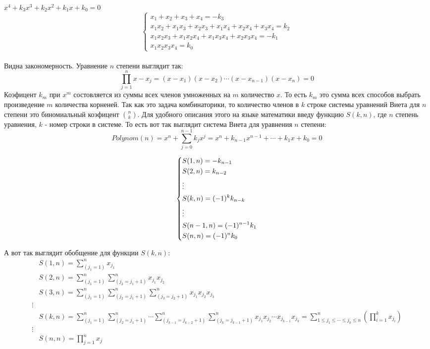 \documentclass{article} %
\begin{document}
{		$x^4+k_3x^3+k_2x^2+k_1x+k_0 = 0$\\
		$$\begin{cases} x_1+x_2+x_3+x_4 = -k_3\\ x_1x_2+x_1x_3+x_2x_3+x_1x_4+x_2x_4+x_3x_4 = k_2\\ x_1x_2x_3+x_1x_2x_4+x_1x_3x_4+x_2x_3x_4= -k_1\\  x_1x_2x_3x_4= k_0\end{cases}$$\\
		Видна закономерность. Уравнение $n$ степени выглядит так:\\
		$$\prod_{j=1}^{n}x-x_j = (x-x_1)(x-x_2)\cdots(x-x_{n-1})(x-x_n) = 0$$
		Коэфицент $k_m$ при $x^m$ состовляется из суммы всех членов умноженных на $m$ количество $x$. То есть $k_m$ это сумма всех способов выбрать произведение $m$ количества корненей. Так как это задача комбинаторики, то количество членов в $k$ строке системы уравнений Виета для $n$ степени это биномиальный коэфицент ${n \choose k}$. Для удобного описания этого на языке математики введу функцию $S(k, n)$, где $n$ степень уравнения, $k$ - номер строки в системе. То есть вот так выглядит система Виета для уравнения $n$ степени:
		$$Polynom(n) = x^n + \sum_{j=0}^{n-1}k_jx^j = x^n+k_{n-1}x^{n-1}+\cdots+k_1x+k_0 = 0$$
		
		$$
		\begin{dcases}
			S(1, n) = -k_{n-1}\\
			S(2, n) = k_{n-2}\\
			\vdots\\
			S(k, n) = (-1)^{k}k_{n-k}\\
			\vdots\\
			S(n-1, n) = (-1)^{n-1}k_1\\
			S(n, n) = (-1)^{n}k_0\\
		\end{dcases}
		$$
		
		А вот так выглядит обобщение для функции $S(k, n)$:
		\begin{align*}
			&S(1, n) = \sum_{(j_1=1)}^{n}x_{j_1}\\
			&S(2, n) = \sum_{(j_1=1)}^{n}\sum_{(j_2=j_1+1)}^{n}x_{j_1}x_{j_2}\\
			&S(3, n) = \sum_{(j_1=1)}^{n}\sum_{(j_2=j_1+1)}^{n}\sum_{(j_3=j_2+1)}^{n}x_{j_1}x_{j_2}x_{j_3}\\
			\vdots\\
			&S(k, n) = \sum_{(j_1=1)}^{n}\sum_{(j_2=j_1+1)}^{n}\cdots\sum_{(j_{k-1}=j_{k-2}+1)}^{n}\sum_{(j_{k}=j_{k-1}+1)}^{n}x_{j_1}x_{j_2}\cdots x_{j_{k-1}}x_{j_k} = \sum_{1\leq j_1 \leq\cdots\leq j_k \leq n}^{n}\left(\prod_{i=1}^{k}{x_{j_i}}\right)\\
			\vdots\\
			&S(n, n) = \prod_{j=1}^{n}{x_j}
		\end{align*}	
	}
\end{document}
